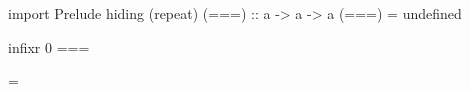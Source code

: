 
\usepackage{mathtools}
\usepackage{pifont}

\usepackage{url}
\let\Bbbk\relax  %
\usepackage{tikz}
\usepackage{chngcntr} %
\usepackage{caption}
\usepackage{subcaption}
\usepackage{scalerel}
\usepackage{mdframed}

\begin{code}
import Prelude hiding (repeat)
(===) :: a -> a -> a
(===) = undefined

infixr 0 ===
\end{code}





\usepackage{doubleequals}

\newtheorem{theorem}{Theorem}
\newtheorem{lemma}{Lemma}

\def\commentbegin{\quad$\{$~}
\def\commentend{$\}$}
\mathindent=\parindent
\addtolength{\mathindent}{0.3cm}
\allowdisplaybreaks

\newcommand{\tagx}[1][]{\refstepcounter{equation}(\theequation)\label{#1}}
\newcommand\numberthis{\refstepcounter{equation}\tag{\theequation}}

\newcommand{\todo}[1]{{\color{brown}\lbrack{\bf to do}: #1 \rbrack}}

\newcommand{\paraskip}{\vspace{0.3cm}}


